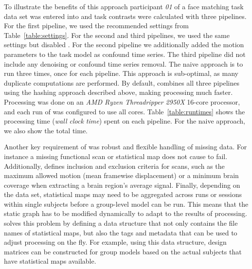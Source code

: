 To illustrate the benefits of this approach participant \emph{01} of a face matching task data set \parencite{wakeman2015} was entered into  and task contrasts were calculated with three pipelines. For the first pipeline, we used the recommended settings from Table~\ref{table:settings}. For the second and third pipelines, we used the same settings but disabled . For the second pipeline we additionally added the motion parameters to the task model as confound time series. The third pipeline did not include any denoising or confound time series removal. The naive approach is to run  three times, once for each pipeline. This approach is sub-optimal, as many duplicate computations are performed. By default,  combines all three pipelines using the hashing approach described above, making processing much faster. Processing was done on an \emph{AMD Ryzen Threadripper 2950X} 16-core processor, and each run of  was configured to use all cores. Table~\ref{table:runtimes} shows the processing time (\emph{wall clock time}) spent on each pipeline. For the naive approach, we also show the total time.



Another key requirement of  was robust and flexible handling of missing data. For instance a missing functional scan or statistical map does not cause  to fail. Additionally,  defines inclusion and exclusion criteria for scans, such as the maximum allowed motion (mean framewise displacement) or a minimum brain coverage when extracting a brain region's average signal. Finally, depending on the data set, statistical maps may need to be aggregated across runs or sessions within single subjects before a group-level model can be run. This means that the static graph has to be modified dynamically to adapt to the results of processing.  solves this problem by defining a data structure that not only contains the file names of statistical maps, but also the tags and metadata that can be used to adjust processing on the fly. For example, using this data structure, design matrices can be constructed for group models based on the actual subjects that have statistical maps available.
